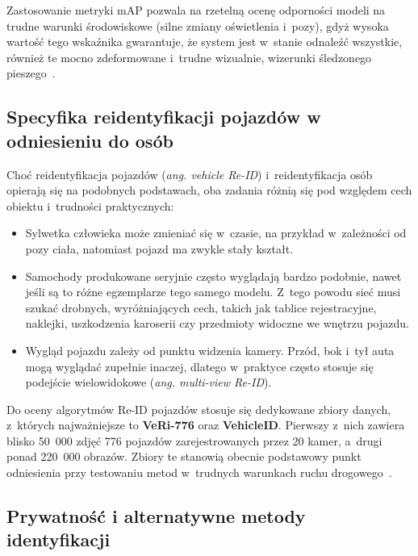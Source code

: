 Zastosowanie metryki mAP pozwala na rzetelną ocenę odporności modeli na trudne warunki środowiskowe
(silne zmiany oświetlenia i~pozy), gdyż wysoka wartość tego wskaźnika gwarantuje, że system jest
w~stanie odnaleźć wszystkie, również te mocno zdeformowane i~trudne wizualnie, wizerunki śledzonego
pieszego~\cite{sun2018beyond}.

\subsection{Specyfika reidentyfikacji pojazdów w odniesieniu do osób}
\label{subsec:vehicle_vs_person_reid}

Choć reidentyfikacja pojazdów (\textit{ang. vehicle Re-ID}) i~reidentyfikacja osób opierają się na
podobnych podstawach, oba zadania różnią się pod względem cech obiektu i~trudności praktycznych:
\begin{itemize}
  \item Sylwetka człowieka może zmieniać się w~czasie, na przykład w~zależności od pozy ciała, natomiast
        pojazd ma zwykle stały kształt.
  \item Samochody produkowane seryjnie często wyglądają bardzo podobnie, nawet jeśli są to różne
        egzemplarze tego samego modelu. Z~tego powodu sieć musi szukać drobnych, wyróżniających cech,
        takich jak tablice rejestracyjne, naklejki, uszkodzenia karoserii czy przedmioty widoczne we
        wnętrzu pojazdu.
  \item Wygląd pojazdu zależy od punktu widzenia kamery. Przód, bok i~tył auta mogą wyglądać zupełnie
        inaczej, dlatego w~praktyce często stosuje się podejście wielowidokowe (\textit{ang. multi-view
          Re-ID}).
\end{itemize}

Do oceny algorytmów Re-ID pojazdów stosuje się dedykowane zbiory danych, z~których najważniejsze to
\textbf{VeRi-776} oraz \textbf{VehicleID}. Pierwszy z~nich zawiera blisko 50~000 zdjęć 776 pojazdów
zarejestrowanych przez 20 kamer, a~drugi ponad 220~000 obrazów. Zbiory te stanowią obecnie
podstawowy punkt odniesienia przy testowaniu metod w~trudnych warunkach ruchu
drogowego~\cite{he2021transreid}.

\subsection{Prywatność i alternatywne metody identyfikacji}
\label{subsec:privacy_reid}

